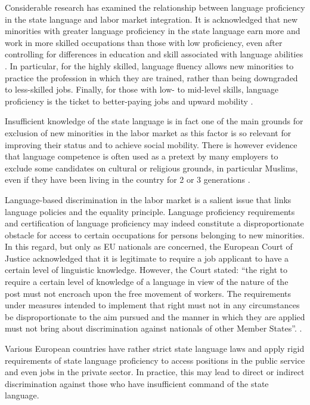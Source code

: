 \documentclass[output=paper,colorlinks,citecolor=brown]{langscibook}
\begin{document}
Considerable research has examined the relationship between language proficiency in the state language and labor market integration. It is acknowledged that new minorities with greater language proficiency in the state language earn more and work in more skilled occupations than those with low proficiency, even after controlling for differences in education and skill associated with language abilities \citep{mchugh_challinor2011}. In particular, for the highly skilled, language fluency allows new minorities to practice the profession in which they are trained, rather than being downgraded to less-skilled jobs. Finally, for those with low- to mid-level skills, language proficiency is the ticket to better-paying jobs and upward mobility \citep{mchugh_challinor2011}.

Insufficient knowledge of the state language is in fact one of the main grounds for exclusion of new minorities in the labor market as this factor is so relevant for improving their status and to achieve social mobility. There is however evidence that language competence is often used as a pretext by many employers to exclude some candidates on cultural or religious grounds, in particular Muslims, even if they have been living in the country for 2 or 3 generations \citep{dechief_oreopoulos2012}.

Language-based discrimination in the labor market is a salient issue that links language policies and the equality principle. Language proficiency requirements and certification of language proficiency may indeed constitute a disproportionate obstacle for access to certain occupations for persons belonging to new minorities. In this regard, but only as EU nationals are concerned, the European Court of Justice acknowledged that it is legitimate to require a job applicant to have a certain level of linguistic knowledge. However, the Court stated: ``the right to require a certain level of knowledge of a language in view of the nature of the post must not encroach upon the free movement of workers. The requirements under measures intended to implement that right must not in any circumstances be disproportionate to the aim pursued and the manner in which they are applied must not bring about discrimination against nationals of other Member States''. \citep{ecj2015_belgium}.

Various European countries have rather strict state language laws and apply rigid requirements of state language proficiency to access positions in the public service and even jobs in the private sector. In practice, this may lead to direct or indirect discrimination against those who have insufficient command of the state language.
\end{document}
